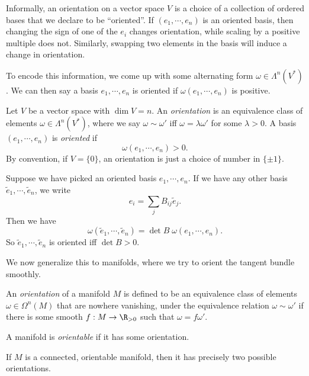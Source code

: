 \documentclass[a4paper]{article}
\begin{document}
Informally, an orientation on a vector space $V$ is a choice of a collection of ordered bases that we declare to be ``oriented''. If $(e_1, \cdots, e_n)$ is an oriented basis, then changing the sign of one of the $e_i$ changes orientation, while scaling by a positive multiple does not. Similarly, swapping two elements in the basis will induce a change in orientation.

To encode this information, we come up with some alternating form $\omega \in \Lambda^n(V^*)$. We can then say a basis $e_1, \cdots, e_n$ is oriented if $\omega(e_1, \cdots, e_n)$ is positive.

\begin{defi}
  Let $V$ be a vector space with $\dim V = n$. An \emph{orientation} is an equivalence class of elements $\omega \in\Lambda^n (V^*)$, where we say $\omega \sim \omega'$ iff $\omega = \lambda \omega'$ for some $\lambda > 0$. A basis $(e_1, \cdots, e_n)$ is \emph{oriented} if
  \[
    \omega(e_1, \cdots, e_n) > 0.
  \]
  By convention, if $V = \{0\}$, an orientation is just a choice of number in $\{\pm 1\}$.
\end{defi}

Suppose we have picked an oriented basis $e_1, \cdots, e_n$. If we have any other basis $\tilde{e}_1, \cdots, \tilde{e}_n$, we write
\[
  e_i = \sum_j B_{ij} \tilde{e}_j.
\]
Then we have
\[
  \omega (\tilde{e}_1, \cdots, \tilde{e}_n) = \det B\; \omega(e_1, \cdots, e_n).
\]
So $\tilde{e}_1, \cdots, \tilde{e}_n$ is oriented iff $\det B > 0$.

We now generalize this to manifolds, where we try to orient the tangent bundle smoothly.

\begin{defi}
  An \emph{orientation} of a manifold $M$ is defined to be an equivalence class of elements $\omega \in \Omega^n(M)$ that are nowhere vanishing, under the equivalence relation $ \omega \sim \omega'$ if there is some smooth $f: M \to \R_{> 0}$ such that $\omega = f \omega'$.
\end{defi}

\begin{defi}
  A manifold is \emph{orientable} if it has some orientation.
\end{defi}

If $M$ is a connected, orientable manifold, then it has precisely two possible orientations.
\end{document}
